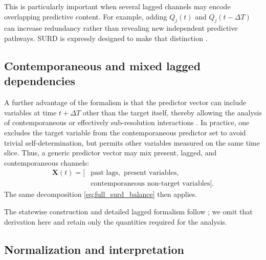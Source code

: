 \documentclass[fleqn,usenatbib]{mnras}
\begin{document}
This is particularly important when several lagged channels may encode overlapping predictive content. For example, adding \(Q_j(t)\) and \(Q_j(t-\Delta T)\) can increase redundancy rather than revealing new independent predictive pathways. SURD is expressly designed to make that distinction \cite{MartinezSanchez2024SURD}.

\subsection{Contemporaneous and mixed lagged dependencies}

A further advantage of the formalism is that the predictor vector can include variables at time \(t+\Delta T\) other than the target itself, thereby allowing the analysis of contemporaneous or effectively sub-resolution interactions \cite{MartinezSanchez2024SURD}. In practice, one excludes the target variable from the contemporaneous predictor set to avoid trivial self-determination, but permits other variables measured on the same time slice. Thus, a generic predictor vector may mix present, lagged, and contemporaneous channels:
\begin{equation}
\begin{split}
\mathbf{X}(t) = \bigl[ & \text{past lags}, \text{ present variables}, \\
                       & \text{contemporaneous non-target variables} \bigr].
\end{split}
\end{equation}
The same decomposition \eqref{eq:full_surd_balance} then applies.

\fi
The statewise construction and detailed lagged formalism follow \citet{MartinezSanchez2024SURD}; we omit that derivation here and retain only the quantities required for the analysis.

\subsection{Normalization and interpretation}
\end{document}
